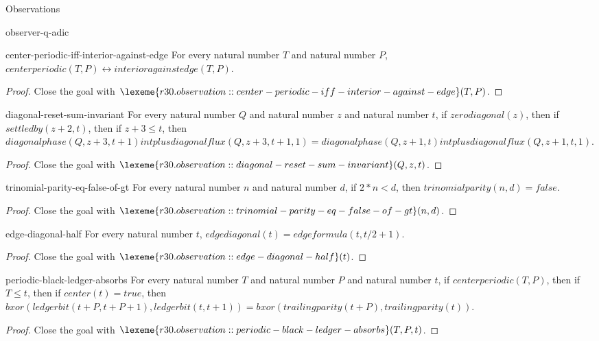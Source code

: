 \begin{lexlean}{Observations}
\begin{section}{observer-q-adic}
\begin{theorem}{center-periodic-iff-interior-against-edge}
For every natural number \(T\) and natural number \(P\), \(centerperiodic(T, P) ↔ interioragainstedge(T, P)\).
\begin{proof}
Close the goal with \(\lexeme{r30.observation::center-periodic-iff-interior-against-edge}(T, P)\).
\end{proof}
\end{theorem}

\begin{theorem}{diagonal-reset-sum-invariant}
For every natural number \(Q\) and natural number \(z\) and natural number \(t\), if \(zerodiagonal(z)\), then if \(settledby(z + 2, t)\), then if \(z + 3 ≤ t\), then \(diagonalphase(Q, z + 3, t + 1) intplus diagonalflux(Q, z + 3, t + 1, 1) = diagonalphase(Q, z + 1, t) intplus diagonalflux(Q, z + 1, t, 1)\).
\begin{proof}
Close the goal with \(\lexeme{r30.observation::diagonal-reset-sum-invariant}(Q, z, t)\).
\end{proof}
\end{theorem}

\begin{theorem}{trinomial-parity-eq-false-of-gt}
For every natural number \(n\) and natural number \(d\), if \(2 * n < d\), then \(trinomialparity(n, d) = false\).
\begin{proof}
Close the goal with \(\lexeme{r30.observation::trinomial-parity-eq-false-of-gt}(n, d)\).
\end{proof}
\end{theorem}

\begin{theorem}{edge-diagonal-half}
For every natural number \(t\), \(edgediagonal(t) = edgeformula(t, t / 2 + 1)\).
\begin{proof}
Close the goal with \(\lexeme{r30.observation::edge-diagonal-half}(t)\).
\end{proof}
\end{theorem}

\begin{theorem}{periodic-black-ledger-absorbs}
For every natural number \(T\) and natural number \(P\) and natural number \(t\), if \(centerperiodic(T, P)\), then if \(T ≤ t\), then if \(center(t) = true\), then \(bxor(ledgerbit(t + P, t + P + 1), ledgerbit(t, t + 1)) = bxor(trailingparity(t + P), trailingparity(t))\).
\begin{proof}
Close the goal with \(\lexeme{r30.observation::periodic-black-ledger-absorbs}(T, P, t)\).
\end{proof}
\end{theorem}


\end{section}
\end{lexlean}
